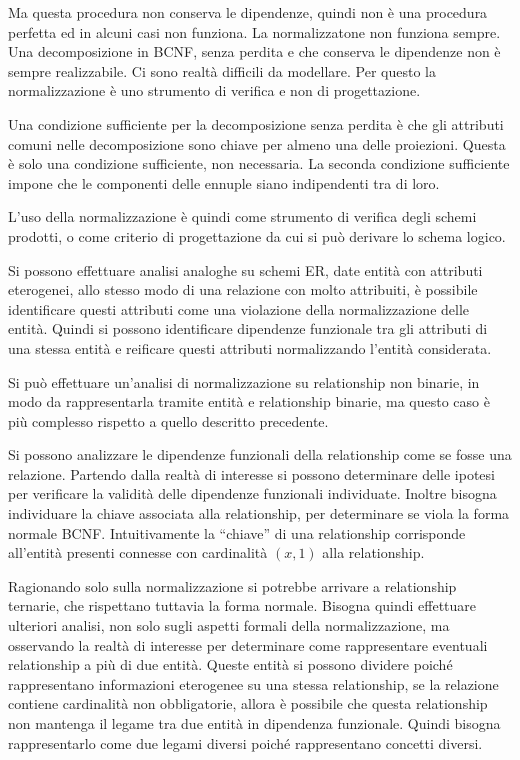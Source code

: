 \documentclass{article}
\numberwithin{equation}{subsection}
\begin{document}
Ma questa procedura non conserva le dipendenze, quindi non è una procedura perfetta ed in alcuni casi non funziona. La normalizzatone non funziona sempre. Una 
decomposizione in BCNF, senza perdita e che conserva le dipendenze non è sempre realizzabile. Ci sono realtà difficili da modellare. Per questo la normalizzazione è 
uno strumento di verifica e non di progettazione. 

Una condizione sufficiente per la decomposizione senza perdita è che gli attributi comuni nelle decomposizione sono chiave per almeno una delle proiezioni. Questa è 
solo una condizione sufficiente, non necessaria. La seconda condizione sufficiente impone che le componenti 
delle ennuple siano indipendenti tra di loro. 

L'uso della normalizzazione è quindi come strumento di verifica degli schemi prodotti, o come criterio di progettazione da cui si può derivare lo schema logico. 


Si possono effettuare analisi analoghe su schemi ER, date entità con attributi eterogenei, allo stesso modo di una relazione con molto attribuiti, è possibile 
identificare questi attributi come una violazione della normalizzazione delle entità. 
Quindi si possono identificare dipendenze funzionale tra gli attributi di una stessa entità e reificare questi attributi normalizzando l'entità considerata. 


Si può effettuare un'analisi di normalizzazione su relationship non binarie, in modo da rappresentarla tramite entità e relationship binarie, ma questo caso è 
più complesso rispetto a quello descritto precedente. 


Si possono analizzare le dipendenze funzionali della relationship come se fosse una relazione. Partendo dalla realtà di interesse si possono determinare delle ipotesi 
per verificare la validità delle dipendenze funzionali individuate. Inoltre bisogna individuare la chiave associata alla relationship, per determinare se viola 
la forma normale BCNF. Intuitivamente la ``chiave'' di una relationship corrisponde all'entità presenti connesse con cardinalità $(x,1)$ alla relationship. 

Ragionando solo sulla normalizzazione si potrebbe arrivare a relationship ternarie, che rispettano tuttavia la forma normale. Bisogna quindi effettuare ulteriori 
analisi, non solo sugli aspetti formali della normalizzazione, ma osservando la realtà di interesse per determinare come rappresentare eventuali relationship a più 
di due entità. 
Queste entità si possono dividere poiché rappresentano informazioni eterogenee su una stessa relationship, se la relazione contiene cardinalità non obbligatorie, 
allora è possibile che questa relationship non mantenga il legame tra due entità in dipendenza funzionale. Quindi bisogna rappresentarlo come due legami diversi 
poiché rappresentano concetti diversi. 
\end{document}
